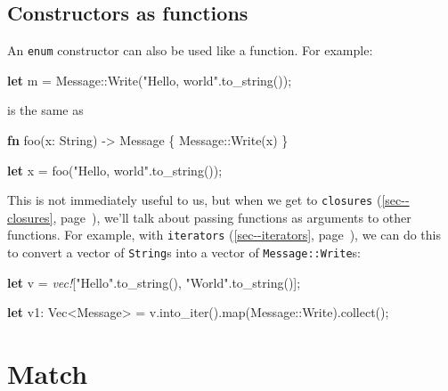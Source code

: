 \documentclass[a4paper,]{book}
\renewcommand*{\hypertarget}[3][\ar]{%
  \def\ar{#2}%
  \label{#1}%
  #3}
\renewcommand*{\hyperlink}[2]{%
 #2 (\autoref{#1}, page~\pageref{#1})}
\newenvironment{Shaded}{\begin{snugshade}}{\end{snugshade}}
\newcommand{\KeywordTok}[1]{\textcolor[rgb]{0.13,0.29,0.53}{\textbf{{#1}}}}
\newcommand{\DataTypeTok}[1]{\textcolor[rgb]{0.13,0.29,0.53}{{#1}}}
\newcommand{\StringTok}[1]{\textcolor[rgb]{0.31,0.60,0.02}{{#1}}}
\newcommand{\PreprocessorTok}[1]{\textcolor[rgb]{0.56,0.35,0.01}{\textit{{#1}}}}
\newcommand{\NormalTok}[1]{{#1}}
\begin{document}
\subsection{Constructors as functions}\label{constructors-as-functions}

An \texttt{enum} constructor can also be used like a function. For
example:

\begin{Shaded}
\begin{Highlighting}[]
\KeywordTok{let} \NormalTok{m = Message::Write(}\StringTok{"Hello, world"}\NormalTok{.to_string());}
\end{Highlighting}
\end{Shaded}

is the same as

\begin{Shaded}
\begin{Highlighting}[]
\KeywordTok{fn} \NormalTok{foo(x: }\DataTypeTok{String}\NormalTok{) -> Message \{}
    \NormalTok{Message::Write(x)}
\NormalTok{\}}

\KeywordTok{let} \NormalTok{x = foo(}\StringTok{"Hello, world"}\NormalTok{.to_string());}
\end{Highlighting}
\end{Shaded}

This is not immediately useful to us, but when we get to
\protect\hyperlink{sec--closures}{\texttt{closures}}, we'll talk about
passing functions as arguments to other functions. For example, with
\protect\hyperlink{sec--iterators}{\texttt{iterators}}, we can do this
to convert a vector of \texttt{String}s into a vector of
\texttt{Message::Write}s:

\begin{Shaded}
\begin{Highlighting}[]

\KeywordTok{let} \NormalTok{v = }\PreprocessorTok{vec!}\NormalTok{[}\StringTok{"Hello"}\NormalTok{.to_string(), }\StringTok{"World"}\NormalTok{.to_string()];}

\KeywordTok{let} \NormalTok{v1: }\DataTypeTok{Vec}\NormalTok{<Message> = v.into_iter().map(Message::Write).collect();}
\end{Highlighting}
\end{Shaded}

\hypertarget{sec--match}{\section{Match}\label{sec--match}}
\end{document}
